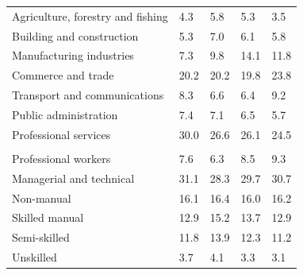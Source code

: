 \documentclass{article}
\begin{document}
\begin{table}[h]
\begin{tabular}{KTTTT}
    \hline
Agriculture, forestry and fishing  & 4.3& 5.8& 5.3& 3.5\\
Building and construction & 5.3& 7.0& 6.1& 5.8\\
Manufacturing industries &  7.3&  9.8& 14.1& 11.8\\
Commerce and trade  & 20.2& 20.2& 19.8& 23.8\\
Transport and communications  & 8.3& 6.6& 6.4& 9.2\\
Public administration & 7.4& 7.1& 6.5& 5.7\\
Professional services & 30.0& 26.6& 26.1& 24.5\\
\hline
    \\ 
    \hline
Professional workers  & 7.6& 6.3 & 8.5& 9.3\\
Managerial and technical & 31.1& 28.3& 29.7& 30.7\\
Non-manual & 16.1& 16.4& 16.0& 16.2\\
Skilled manual & 12.9& 15.2& 13.7& 12.9\\
Semi-skilled & 11.8& 13.9& 12.3& 11.2\\
Unskilled  & 3.7& 4.1& 3.3& 3.1\\
\end{tabular}
\end{table}
\pagebreak
\end{document}
